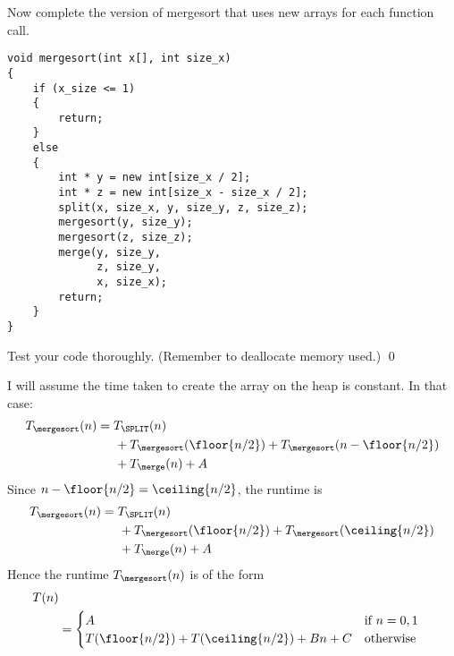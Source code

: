 \begin{ex}
Now complete the version of mergesort that uses new arrays
for each function call.
\begin{Verbatim}[frame=single,fontsize=\footnotesize]
void mergesort(int x[], int size_x)
{
    if (x_size <= 1)
    {
        return;
    }
    else
    {
        int * y = new int[size_x / 2];
        int * z = new int[size_x - size_x / 2];
        split(x, size_x, y, size_y, z, size_z);
        mergesort(y, size_y);
        mergesort(z, size_z);
        merge(y, size_y,
              z, size_y,
              x, size_x);
        return;
    }
}
\end{Verbatim}
Test your code thoroughly.
(Remember to deallocate memory used.)
\qed
\end{ex}

I will assume the time taken to create the array on the heap
is constant.
In that case:
\begin{align*}
T_{\mergesort}(n) 
&= T_{\SPLIT}(n)  \\
&\hspace{0.5cm} + T_{\mergesort}(\floor{n/2})
  + T_{\mergesort}(n - \floor{n/2}) \\
&\hspace{0.5cm} + T_{\merge}(n) + A
\end{align*}
Since $n - \floor{n/2} = \ceiling{n/2}$,
the runtime is 
\begin{align*}
T_{\mergesort}(n) 
&= T_{\SPLIT}(n)  \\
&\hspace{0.5cm} + T_{\mergesort}(\floor{n/2})
  + T_{\mergesort}(\ceiling{n/2}) \\
&\hspace{0.5cm} + T_{\merge}(n) + A
\end{align*}
Hence the runtime $T_{\mergesort}(n)$ is of the form
\begin{align*}
T(n) \\
&=
 \begin{cases}
  A                             & \text{if $n = 0, 1$} \\
  T(\floor{n/2}) 
  + T(\ceiling{n/2}) + Bn + C & \text{otherwise}
 \end{cases}
\end{align*}

